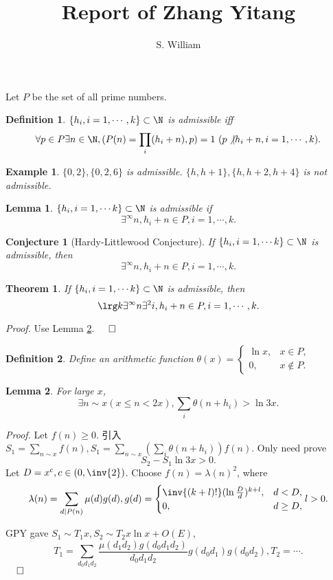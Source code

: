 \documentclass[11pt,a4paper,fleqn]{article}
\newcommand{\ned}{\not|}
\newenvironment{proof}{\emph{Proof.}\hspace{0.5cm}}{$\hspace{0.4cm}\Box$\\}
\newtheorem{theorem}{Theorem}[section]
\newtheorem{lemma}{Lemma}[section]
\newtheorem{conjecture}{Conjecture}[section]
\newtheorem{example}{Example}[section]
\newtheorem{definition}{Definition}[section]
\begin{document}
\title{Report of Zhang Yitang}
\date{}
\author{S. William}
\maketitle


Let $P$ be the set of all prime numbers.
\begin{definition}
  $\{h_i,i=1,\cdots, k\}\subset\N$ is admissible iff
  \[\forall p\in P\exists n\in\N, (P(n)=\prod_i(h_i+n),p)=1 ~ (p\ned h_i+n,i=1,\cdots, k).\]
\end{definition}

\begin{example}
 $\{0,2\},\{0,2,6\}$ is admissible. $\{h,h+1\},\{h,h+2,h+4\}$ is not admissible.
\end{example}

\begin{lemma}
  $\{h_i,i=1,\cdots k\}\subset\N$ is admissible if
  \[\exists^\infty n, h_i+n\in P,i=1,\cdots, k.\]
\end{lemma}

\begin{conjecture}[Hardy-Littlewood Conjecture]
 If $\{h_i,i=1,\cdots k\}\subset\N$ is admissible, then
  \[\exists^\infty n, h_i+n\in P,i=1,\cdots, k.\]
\end{conjecture}

\begin{theorem}\label{th:zhang}
  If $\{h_i,i=1,\cdots k\}\subset\N$ is admissible, then
  \[\lrg k \exists^\infty n \exists^2 i, h_i+n\in P,i=1,\cdots, k.\]
\end{theorem}

\begin{proof}
  Use Lemma \ref{lm:zhang}.
\end{proof}

\begin{definition}Define an arithmetic function
  $\theta(x)=\begin{cases}
    \ln x, & x\in P,\\
    0, & x\not\in P.
  \end{cases}$
\end{definition}

\begin{lemma}\label{lm:zhang}
For large $x$,
  \[\exists n\sim x (x\leq n< 2x),\sum_i\theta(n+h_i) > \ln 3x.\]
\end{lemma}
\begin{proof}
  Let $f(n)\geq 0$. 引入$S_1=\sum_{n\sim x}f(n),S_1=\sum_{n\sim x}(\sum_i\theta(n+h_i))f(n)$. Only need prove
  \[S_2-S_1\ln 3x >0.\]
  Let $D=x^c,c\in(0,\inv{2})$. Choose $f(n)=\lambda(n)^2$, where
  \[\lambda(n)=\sum_{d|P(n)}\mu(d)g(d),g(d)=\begin{cases}
  \inv{(k+l)!}(\ln\frac{D}{d})^{k+l}, & d<D,\\
  0, & d\geq D,
  \end{cases}l>0.\]

GPY gave $S_1\sim T_1x, S_2\sim T_2 x\ln x+O(E)$,
  \[T_1=\sum_{d_0d_1d_2}\frac{\mu(d_1d_2)g(d_0d_1d_2)}{d_0d_1d_2}g(d_0d_1)g(d_0d_2), T_2=\cdots.\]
\end{proof}
\end{document}
